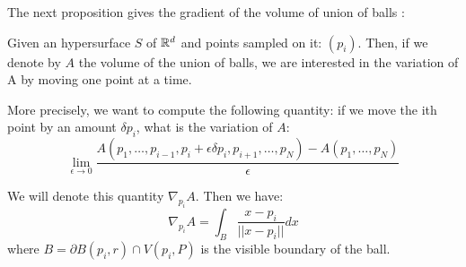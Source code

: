 The next proposition gives the gradient of the volume of union of balls :
\begin{proposition}
    Given an hypersurface $ S $ of $ \mathbb{R}^d $ and points sampled on it: $ (p_i) $.
    Then, if we denote by $ A $ the volume of the union of balls, we are
    interested in the variation of A by moving one point at a time.

    More precisely, we want to compute the following quantity: if we move the
    ith point by an amount $ \delta p_i $, what is the variation of $ A $:
    $$ \lim\limits_{\epsilon \to 0} \frac{A(p_1, \ldots, p_{i-1}, p_i + \epsilon
        \delta p_i, p_{i+1}, \ldots, p_N) - A(p_1, \ldots, p_N)}{\epsilon} $$

    We will denote this quantity $ \nabla_{p_i} A $. Then we have:
    \begin{equation}
        \label{eqn:gradient_area_2d}
        \nabla_{p_i} A = \int_{B} \frac{x - p_i}{||x - p_i||} dx
    \end{equation}
    where $ B = \partial B(p_i, r) \cap V(p_i, P) $ is the visible boundary of
    the ball.
\end{proposition}

